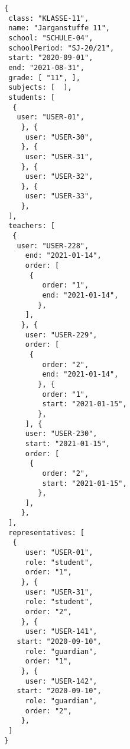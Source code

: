 
\begin{lstlisting}[caption={Klassen-Datenmodell Beispiel 2: Jahrgangstufe 11, Sekundarstufe 2},frame=tlrb]
{
 class: "KLASSE-11",
 name: "Jarganstuffe 11",
 school: "SCHULE-04",
 schoolPeriod: "SJ-20/21",
 start: "2020-09-01",
 end: "2021-08-31",
 grade: [ "11", ],
 subjects: [  ],
 students: [
  { 
   user: "USER-01",
	}, { 
	 user: "USER-30",
	}, { 
	 user: "USER-31",
	}, { 
	 user: "USER-32",
	}, { 
	 user: "USER-33",
	},
 ],
 teachers: [
  { 
   user: "USER-228",
	 end: "2021-01-14",
	 order: [
	  {
		 order: "1",
		 end: "2021-01-14",
		},
	 ],
	}, { 
	 user: "USER-229",
	 order: [
	  {
		 order: "2",
		 end: "2021-01-14",
		}, {
		 order: "1",
		 start: "2021-01-15",
		},
	 ], { 
	 user: "USER-230",
	 start: "2021-01-15",
	 order: [
	  {
		 order: "2",
		 start: "2021-01-15",
		},
	 ],
	},
 ],
 representatives: [
  {
	 user: "USER-01",
	 role: "student",
	 order: "1",	 
	}, {
	 user: "USER-31",
	 role: "student",
	 order: "2",	 
	}, {
	 user: "USER-141",
   start: "2020-09-10",
	 role: "guardian",
	 order: "1",	 
	}, {
	 user: "USER-142",
   start: "2020-09-10",
	 role: "guardian",
	 order: "2",	 
	},  
 ]
}
\end{lstlisting}
